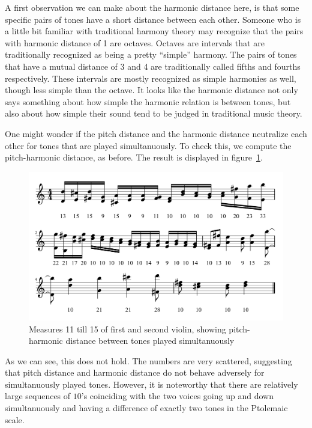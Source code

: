 \documentclass[a4paper]{book}
\theoremstyle{definition}
\begin{document}
A first observation we can make about the harmonic distance here, is that some specific pairs of tones have a short distance between each other.
Someone who is a little bit familiar with traditional harmony theory may recognize that the pairs with harmonic distance of 1 are octaves.
Octaves are intervals that are traditionally recognized as being a pretty ``simple'' harmony.
The pairs of tones that have a mutual distance of 3 and 4 are traditionally called fifths and fourths respectively.
These intervals are mostly recognized as simple harmonies as well, though less simple than the octave.
It looks like the harmonic distance not only says something about how simple the harmonic relation is between tones, but also about how simple their sound tend to be judged in traditional music theory.

One might wonder if the pitch distance and the harmonic distance neutralize each other for tones that are played simultanuously.
To check this, we compute the pitch-harmonic distance, as before.
The result is displayed in figure~\ref{fig_first_second_violin_melodic_harmonic_distance_self}.

\begin{figure}[H]
    \centering
    \includegraphics[scale=0.25]{figures/fig_first_second_violin_melodic_harmonic_distance_self.png}
    \caption{Measures 11 till 15 of first and second violin, showing pitch-harmonic distance between tones played simultanuously}
    \label{fig_first_second_violin_melodic_harmonic_distance_self}
\end{figure}

As we can see, this does not hold.
The numbers are very scattered, suggesting that pitch distance and harmonic distance do not behave adversely for simultanuously played tones.
However, it is noteworthy that there are relatively large sequences of $10$'s co\"inciding with the two voices going up and down simultanuously and having a difference of exactly two tones in the Ptolemaic scale.
\end{document}
